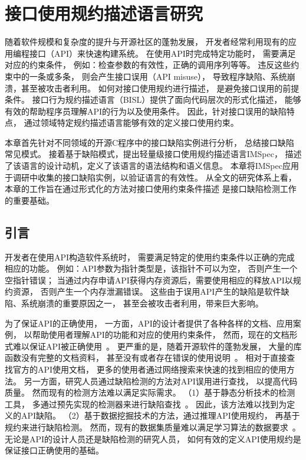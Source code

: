 \chapter{接口使用规约描述语言研究}
\label{cha:impsec}
随着软件规模和复杂度的提升与开源社区的蓬勃发展，
开发者经常利用现有的应用编程接口（API）来快速构建系统。
在使用API时完成特定功能时，
需要满足对应的约束条件，
例如：检查参数的有效性，正确的调用序列等等。
违反这些约束中的一条或多条，
则会产生接口误用（API misuse），
导致程序缺陷、系统崩溃，甚至被攻击者利用。
如何对接口使用规约进行描述，
是避免接口误用的前提条件。
接口行为规约描述语言（BISL）提供了面向代码层次的形式化描述，
能够有效的帮助程序员理解API的行为以及使用条件。
因此，针对接口误用的缺陷特点，
通过领域特定规约描述语言能够有效的定义接口使用约束。


本章首先针对不同领域的开源C程序中的接口缺陷实例进行分析，
总结接口缺陷常见模式。
接着基于缺陷模式，提出轻量级接口使用规约描述语言IMSpec，
描述了该语言的设计动机，定义了该语言的语法结构和语义信息。
本章将IMSpec应用于调研中收集的接口缺陷实例，以验证语言的有效性。
从全文的研究体系上看，本章的工作旨在通过形式化的方法对接口使用约束条件描述
是接口缺陷检测工作的重要基础。


\section{引言}
开发者在使用API构造软件系统时，
需要满足特定的使用约束条件以正确的完成相应的功能。
例如：API参数为指针类型是，该指针不可以为空，
否则产生一个空指针错误；
当通过内存申请API获得内存资源后，需要使用相应的释放API以规约资源，
否则产生一个内存泄漏错误。
这些由于误用API产生的缺陷是软件缺陷、系统崩溃的重要原因之一，
甚至会被攻击者利用，带来巨大影响。


为了保证API的正确使用，
一方面，API的设计者提供了各种各样的文档、应用案例，
以帮助使用者理解API的功能和对应的使用约束条件，
然而，现在的文档形式难以保证API被正确使用~\cite{09-icse-doc}。
更严重的是，随着开源软件的蓬勃发展，
大量的库函数没有完整的文档资料，
甚至没有或者存在错误的使用说明~\cite{15-ieee-doc-fail, 17-icse-api-doc}。
相对于直接查找官方的API使用文档，
更多的使用者通过网络搜索来快速的找到相应的使用方法。
另一方面，研究人员通过缺陷检测的方法对API误用进行查找，
以提高代码质量。
然而现有的检测方法难以满足实际需求。
（1）基于静态分析技术的检测工具，
多通过预先实现的检测器来进行缺陷查找~\cite{15-coufless-static-survey}。
因此，该方法难以找到为定义的API缺陷。
（2）基于数据挖掘技术的方法，通过推理API使用规约，
再基于规约来进行缺陷检测。
然而，现有的数据集质量难以满足学习算法的数据要求~\cite{survey18}。
无论是API的设计人员还是缺陷检测的研究人员，
如何有效的定义API使用规约是保证接口正确使用的基础。

